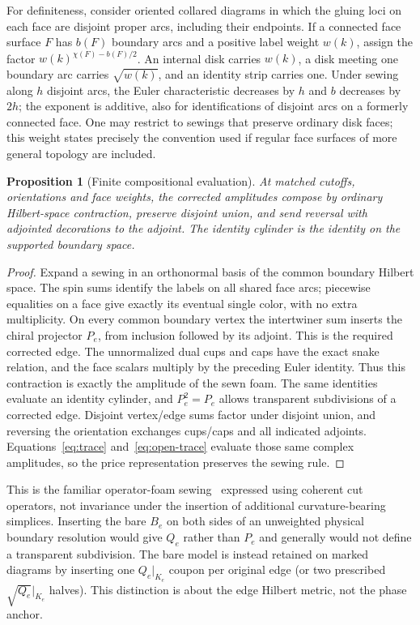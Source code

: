 \documentclass[11pt]{article}
\newtheorem{proposition}[theorem]{Proposition}
\theoremstyle{remark}
\begin{document}
For definiteness, consider oriented collared diagrams in which the gluing loci on each face are disjoint proper arcs, including their endpoints. If a connected face surface \(F\) has \(b(F)\) boundary arcs and a positive label weight \(w(k)\), assign the factor \(w(k)^{\chi(F)-b(F)/2}\). An internal disk carries \(w(k)\), a disk meeting one boundary arc carries \(\sqrt{w(k)}\), and an identity strip carries one. Under sewing along \(h\) disjoint arcs, the Euler characteristic decreases by \(h\) and \(b\) decreases by \(2h\); the exponent is additive, also for identifications of disjoint arcs on a formerly connected face. One may restrict to sewings that preserve ordinary disk faces; this weight states precisely the convention used if regular face surfaces of more general topology are included.

\begin{proposition}[Finite compositional evaluation]\label{prop:glue}
At matched cutoffs, orientations and face weights, the corrected amplitudes compose by ordinary Hilbert-space contraction, preserve disjoint union, and send reversal with adjointed decorations to the adjoint. The identity cylinder is the identity on the supported boundary space.
\end{proposition}
\begin{proof}
Expand a sewing in an orthonormal basis of the common boundary Hilbert space. The spin sums identify the labels on all shared face arcs; piecewise equalities on a face give exactly its eventual single color, with no extra multiplicity. On every common boundary vertex the intertwiner sum inserts the chiral projector \(P_e\), from inclusion followed by its adjoint. This is the required corrected edge. The unnormalized dual cups and caps have the exact snake relation, and the face scalars multiply by the preceding Euler identity. Thus this contraction is exactly the amplitude of the sewn foam. The same identities evaluate an identity cylinder, and \(P_e^2=P_e\) allows transparent subdivisions of a corrected edge. Disjoint vertex/edge sums factor under disjoint union, and reversing the orientation exchanges cups/caps and all indicated adjoints. Equations~\eqref{eq:trace} and~\eqref{eq:open-trace} evaluate those same complex amplitudes, so the price representation preserves the sewing rule.
\end{proof}

This is the familiar operator-foam sewing~\cite{Operator} expressed using coherent cut operators, not invariance under the insertion of additional curvature-bearing simplices. Inserting the bare \(B_e\) on both sides of an unweighted physical boundary resolution would give \(Q_e\) rather than \(P_e\) and generally would not define a transparent subdivision. The bare model is instead retained on marked diagrams by inserting one \(Q_e|_{K_e}\) coupon per original edge (or two prescribed \(\sqrt{Q_e}|_{K_e}\) halves). This distinction is about the edge Hilbert metric, not the phase anchor.
\end{document}
